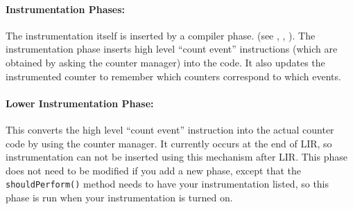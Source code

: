 \paragraph{Instrumentation Phases:}  The instrumentation itself is
inserted by a compiler phase.  (see
,
,
).  The instrumentation phase
inserts high level ``count event'' instructions (which are obtained by
asking the counter manager) into the code.  It also updates the
instrumented counter to remember which counters correspond to which
events.

\paragraph{Lower Instrumentation Phase:}  This 
converts the high level ``count event'' instruction into the actual
counter code by using the counter manager.  It currently occurs at the
end of LIR, so instrumentation can not be inserted using this
mechanism after LIR.  This phase does not need to be modified if you
add a new phase, except that the {\tt shouldPerform()} method needs to
have your instrumentation listed, so this phase is run when your
instrumentation is turned on.


